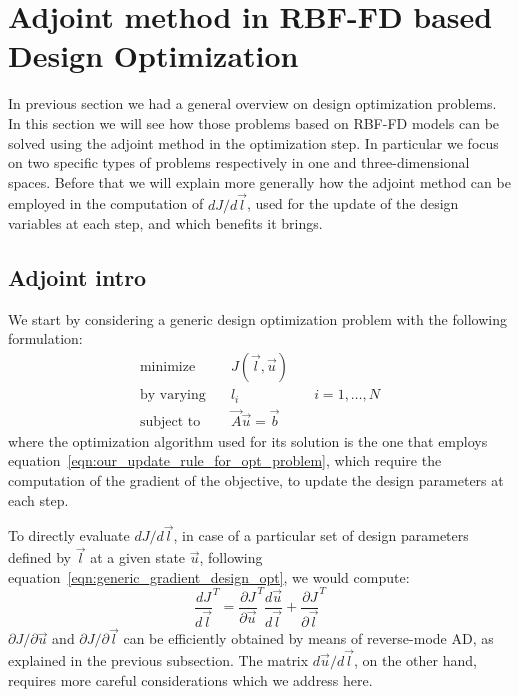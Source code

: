 \section{Adjoint method in RBF-FD based Design Optimization}
\label{sec:adjoint_method}

In previous section we had a general overview on design optimization problems. In this section we will see how those problems based on RBF-FD models can be solved using the adjoint method in the optimization step. In particular we focus on two specific types of problems respectively in one and three-dimensional spaces. Before that we will explain more generally how the adjoint method can be employed in the computation of $dJ / d\vec{l}$, used for the update of the design variables at each step, and which benefits it brings.


\subsection{Adjoint intro}

We start by considering a generic design optimization problem with the following formulation:
\begin{equation}
	\label{eqn:super_general_design_opt_problem_with_RBF-FD_model}
	\begin{aligned}
		\text{minimize}   & \quad J(\vec{l}, \vec{u})			\\
		\text{by varying} & \quad l_i  & \quad i=1, \dots, N    \\
		\text{subject to} & \quad \vec{A} \vec{u} = \vec{b}
	\end{aligned}
\end{equation}
where the optimization algorithm used for its solution is the one that employs equation~\eqref{eqn:our_update_rule_for_opt_problem}, which require the computation of the gradient of the objective, to update the design parameters at each step.

To directly evaluate $dJ / d\vec{l}$, in case of a particular set of design parameters defined by $\vec{l}$ at a given state $\vec{u}$, following equation~\eqref{eqn:generic_gradient_design_opt}, we would compute:
\begin{equation}
	\label{eqn:generic_gradient_design_opt_adjoint_chapter}
	\frac{dJ}{d\vec{l}}^T = \frac{\partial J}{\partial \vec{u}}^T \frac{d\vec{u}}{d\vec{l}} + \frac{\partial J}{\partial \vec{l}}^T
\end{equation}
$\partial J / \partial \vec{u}$ and $\partial J / \partial \vec{l}$ can be efficiently obtained by means of reverse-mode AD, as explained in the previous subsection. The matrix $d\vec{u} / d\vec{l}$, on the other hand, requires more careful considerations which we address here.

